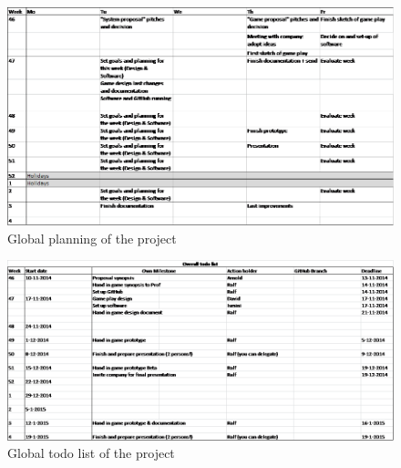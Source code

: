 \documentclass[a4paper,11pt,notitlepage]{report}
\begin{document}
\begin{figure}[H]
	\centering
		\includegraphics[width=1.00\textwidth]{Images/PlanningSmall.png}
	\caption{Global planning of the project}
	\label{fig:Planning}
\end{figure}

\begin{figure}[H]
	\centering
		\includegraphics[width=1.00\textwidth]{Images/Todolist.png}
	\caption{Global todo list of the project}
	\label{fig:Todolist}
\end{figure}
\end{document}
